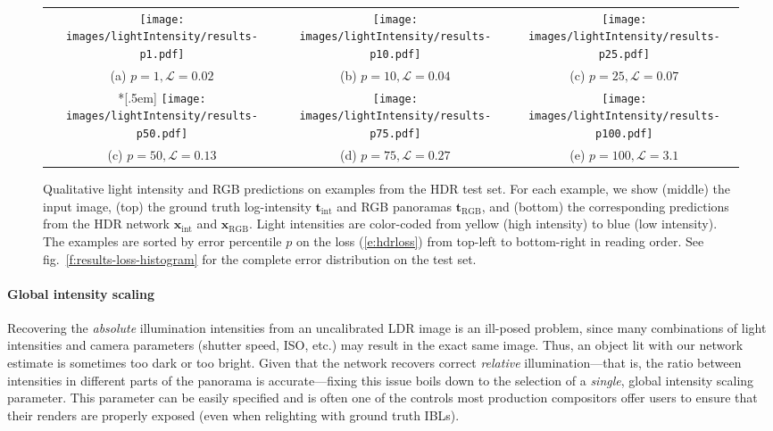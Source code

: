 \begin{figure*}[!t]
\centering
\footnotesize
\setlength{\tabcolsep}{1pt}
\begin{tabular}{ccc}
\texttt{[image: images/lightIntensity/results-p1.pdf]} &
\texttt{[image: images/lightIntensity/results-p10.pdf]} &
\texttt{[image: images/lightIntensity/results-p25.pdf]} \\
(a) $p = 1, \mathcal{L} = 0.02$ & (b) $p = 10, \mathcal{L} = 0.04$ & (c) $p = 25, \mathcal{L} = 0.07$ \\*[.5em]
\texttt{[image: images/lightIntensity/results-p50.pdf]} &
\texttt{[image: images/lightIntensity/results-p75.pdf]} &
\texttt{[image: images/lightIntensity/results-p100.pdf]} \\
(c) $p = 50, \mathcal{L} = 0.13$ & (d) $p = 75, \mathcal{L} = 0.27$ & (e) $p = 100, \mathcal{L} = 3.1$
\end{tabular}
\caption{Qualitative light intensity and RGB predictions on examples from the HDR test set. For each example, we show (middle) the input image, (top) the ground truth log-intensity $\mathbf{t}_\text{int}$ and RGB panoramas $\mathbf{t}_\text{RGB}$, and (bottom) the corresponding predictions from the HDR network $\mathbf{x}_\text{int}$ and $\mathbf{x}_\text{RGB}$. Light intensities are color-coded from yellow (high intensity) to blue (low intensity). The examples are sorted by error percentile $p$ on the loss (\ref{e:hdrloss}) from top-left to bottom-right in reading order. See fig.~\ref{f:results-loss-histogram} for the complete error distribution on the test set.} 
\label{f:results-loss-qualitative}
\end{figure*}

\paragraph{Global intensity scaling}

Recovering the \emph{absolute} illumination intensities from an uncalibrated LDR image is an ill-posed problem, since many combinations of light intensities and camera parameters (shutter speed, ISO, etc.) may result in the exact same image. Thus, an object lit with our network estimate is sometimes too dark or too bright. Given that the network recovers correct \emph{relative} illumination---that is, the ratio between intensities in different parts of the panorama is accurate---fixing this issue boils down to the selection of a \emph{single}, global intensity scaling parameter. This parameter can be easily specified and is often one of the controls most production compositors offer users to ensure that their renders are properly exposed (even when relighting with ground truth IBLs). %


